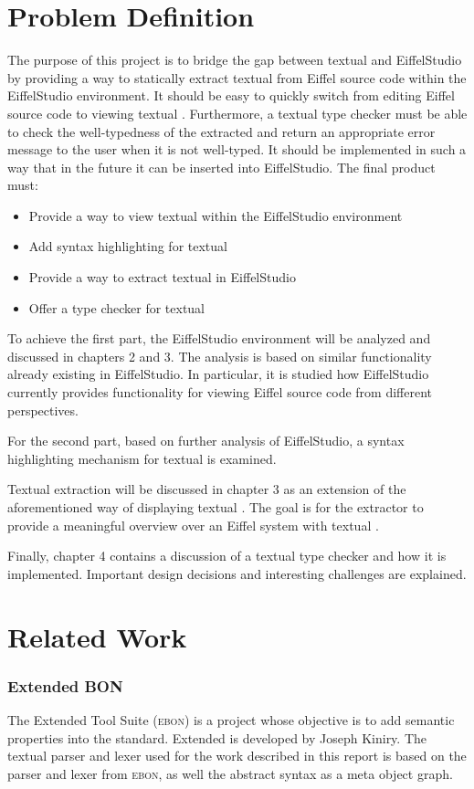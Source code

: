 \section{Problem Definition}
The purpose of this project is to bridge the gap between textual \bon{} and EiffelStudio by providing a way to statically extract textual \bon{} from Eiffel source code within the EiffelStudio environment. It should be easy to quickly switch from editing Eiffel source code to viewing textual \bon. Furthermore, a textual \bon{} type checker must be able to check the well-typedness of the extracted \bon{} and return an appropriate error message to the user when it is not well-typed. It should be implemented in such a way that in the future it can be inserted into EiffelStudio. The final product must:
\begin{itemize}
  \item Provide a way to view textual \bon{} within the EiffelStudio environment
  \item Add syntax highlighting for textual \bon{}
  \item Provide a way to extract textual \bon{} in EiffelStudio
  \item Offer a type checker for textual \bon{} 
\end{itemize}
To achieve the first part, the EiffelStudio environment will be analyzed and discussed in chapters 2 and 3. The analysis is based on similar functionality already existing in EiffelStudio. In particular, it is studied how EiffelStudio currently provides functionality for viewing Eiffel source code from different perspectives.

For the second part, based on further analysis of EiffelStudio, a syntax highlighting mechanism for textual \bon{} is examined.

Textual \bon{} extraction will be discussed in chapter 3 as an extension of the aforementioned way of displaying textual \bon. The goal is for the extractor to provide a meaningful overview over an Eiffel system with textual \bon{}.

Finally, chapter 4 contains a discussion of a textual \bon{} type checker and how it is implemented. Important design decisions and interesting challenges are explained.

\section{Related Work}

\subsubsection{Extended BON}
The Extended \bon{} Tool Suite (\textsc{ebon}) is a project whose objective is to add semantic properties into the \bon{} standard. Extended \bon{} is developed by Joseph Kiniry. The textual \bon{} parser and lexer used for the work described in this report is based on \bon{} the parser and lexer from \textsc{ebon}, as well the abstract syntax as a meta object graph.


